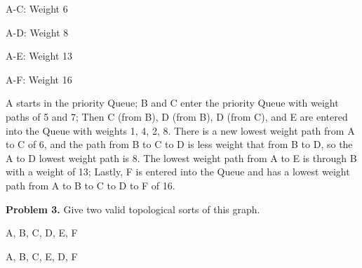\documentclass{article}
\begin{document}
A-C: Weight 6

A-D: Weight 8

A-E: Weight 13

A-F: Weight 16

A starts in the priority Queue; B and C enter the priority Queue with weight
paths of 5 and 7; Then C (from B), D (from B), D (from C), and E are entered
into the Queue with weights 1, 4, 2, 8. There is a new lowest weight path from
A to C of 6, and the path from B to C to D is less weight that from B to D, so the
A to D lowest weight path is 8. The lowest weight path from A to E is through B
with a weight of 13; Lastly, F is entered into the Queue and has a lowest weight
path from A to B to C to D to F of 16.
\vspace*{10mm}\par\textbf{Problem 3.} Give two valid topological sorts of this graph.\par

A, B, C, D, E, F

A, B, C, E, D, F
\end{document}
